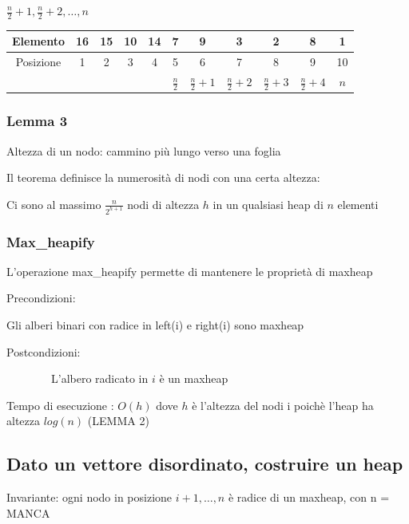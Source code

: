 \documentclass[11pt,a4paper,twoside,openright]{book}
\begin{document}
{{{$\frac{n}{2}+1,\frac{n}{2}+2,\ldots,n$



\begin{tabular}{|c|c|c|c|c|c|c|c|c|c|c|}
\hline 
Elemento & 16 & 15 & 10 & 14 & 7 & 9 & 3 & 2 & 8 & 1 \\ 
\hline 
Posizione & 1 & 2 & 3 & 4 & 5 & 6 & 7 & 8 & 9 & 10 \\ 
\hline 
 &  &  &  &  & $\frac{n}{2}$ & $\frac{n}{2}+1$ & $\frac{n}{2}+2$ & $\frac{n}{2}+3$ & $\frac{n}{2}+4$ & $n$ \\ 
\hline 
\end{tabular} 

\subsubsection{Lemma 3}

{Altezza di un nodo: cammino più lungo verso una foglia}

{Il teorema definisce la numerosità di nodi con una certa altezza:}

{Ci sono al massimo $\frac{n}{2^{h+1}}$ nodi di altezza $h$ in
un qualsiasi heap di $n$ elementi}

\subsubsection{Max\_heapify}}}

{L'operazione max\_heapify permette di mantenere le proprietà di maxheap}

{Precondizioni:}

{Gli alberi binari con radice in left(i) e right(i) sono maxheap}

{Postcondizioni:}

{~~~~~~~~L'albero radicato in $i$ è un maxheap}



{Tempo di esecuzione : $O(h)$ dove $h$ è l'altezza del nodi i poichè l'heap ha altezza $log(n)$ (LEMMA 2)}

\subsection{Dato un vettore disordinato, costruire un heap}



{Invariante: ogni nodo in posizione $i+1,\ldots,n$ è radice di un maxheap, con n = MANCA}

}
\end{document}
